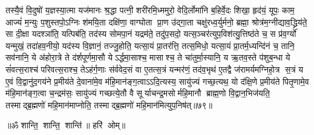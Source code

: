 तस्यै॒वं  वि॒दुषो॑ य॒ज्ञस्या॒त्मा यज॑मानः श्र॒द्धा पत्नी॒ शरी॑रमि॒ध्ममुरो॒ वेदि॒र्लोमा॑नि ब॒\ar{}हिर्वे॒दः  शिखा॒ हृद॑यं॒ यूपः॒ काम॒ आज्यं॑ म॒न्युः प॒शुस्तपो॒ऽग्निः  श॑मयि॒ता दक्षि॑णा॒ वाग्घोता प्रा॒ण उ॑द्गा॒ता चक्षु॑रध्व॒र्युर्मनो॒ ब्रह्मा॒ श्रोत्र॑म॒ग्नीद्याव॒द्ध्रिय॑ते॒ सा दी॒क्षा यदश्ञा॑ति॒ यत्पिब॑ति॒ तद॑स्य सोमपा॒नं यद्रम॑ते॒ तदु॑प॒सदो॒ यत्स॒ञ्चर॑त्युप॒विश॑त्यु॒त्तिष्ठ॑ते च॒ स प्र॑व॒र्ग्यो॑ यन्मुखं॒ तदा॑हव॒नीयो॒ यद॑स्य वि॒ज्ञानं॒ तज्जु॒होति॒ यत्सा॒यं प्रा॒तर॑त्ति॒ तत्स॒मिधो॒ यत्सा॒यं प्रा॒तर्म॒ध्यन्दि॑नं च॒ तानि॒ सव॑नानि॒ ये अ॑होरा॒त्रे ते द॑र्\mbox{}शपूर्णमा॒सौ येऽर्द्धमा॒साश्च॒ मासाश्च॒ ते चा॑तुर्मा॒स्यानि॒ य ऋ॒तव॒स्ते प॑शुब॒न्धा ये सं॑वत्स॒राश्च॑ परिवत्स॒राश्च॒ तेऽह॑र्ग॒णाः स॑र्ववेद॒सं वा ए॒तत्स॒त्रं यन्मर॑णं॒ तद॑व॒भृथ॑ ए॒तद्वै ज॑रामर्यमग्निहो॒त्र स॒त्रं य ए॒वं  वि॒द्वानु॑द॒गय॑ने प्र॒मीय॑ते दे॒वाना॑मे॒व म॑हि॒मान॑ङ्ग॒त्वाऽऽदि॒त्यस्य॒ सायु॑ज्यं गच्छ॒त्यथ॒ यो द॑क्षि॒णे प्र॒मीय॑ते पितृ॒णामे॒व म॑हि॒मान॑ङ्ग॒त्वा च॒न्द्रम॑सः॒ सायु॑ज्यं गच्छत्ये॒तौ वै सूर्याचन्द्र॒मसोर्महि॒मानौ ब्राह्म॒णो वि॒द्वान॒भिज॑यति॒ तस्माद्ब्र॒ह्मणो॑ महि॒मान॑माप्नोति॒ तस्माद्ब्र॒ह्मणो॑ महि॒मान॑मित्युप॒निष॑त्॥७९॥
\anuvakamend



\centerline{॥ॐ शान्ति॒ शान्ति॒ शान्ति॑॥  हरि॑ ओम्॥}

\closesection
\clearpage
